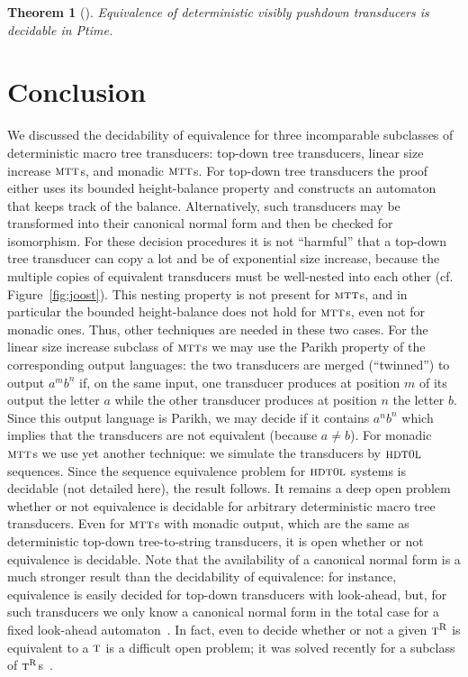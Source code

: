 \documentclass[copyright,creativecommons]{eptcs}
\newtheorem{theorem}{Theorem}
\newcommand{\tr}{\textsc{t}^{\text{R}}}
\newcommand{\ttt}{\textsc{t}}
\newcommand{\mtt}{\textsc{mtt}}
\newcommand{\hdtol}{\textsc{hdt{\small 0}l}}
\begin{document}
\begin{theorem}[\cite{DBLP:conf/fct/StaworkoLLN09}]
Equivalence of deterministic visibly pushdown transducers is
decidable in {\sc Ptime}.
\end{theorem}

\section{Conclusion}

We discussed the decidability of equivalence for three incomparable
subclasses of deterministic macro tree transducers:
top-down tree transducers, linear size increase $\mtt$s, and
monadic $\mtt$s.
For top-down tree transducers the proof either uses its bounded height-balance
property and constructs an automaton that keeps track of the balance.
Alternatively, such transducers may be transformed into their canonical normal form 
and then be checked for isomorphism. For these decision procedures it is not
``harmful'' that a top-down tree transducer can copy a lot and be
of exponential size increase, because the multiple copies of equivalent
transducers must be well-nested into each other (cf. Figure~\ref{fig:joost}).
This nesting property is not present for $\mtt$s, and in particular the 
bounded height-balance does not hold for $\mtt$s, even not for monadic ones.
Thus, other techniques are needed in these two cases.
For the linear size increase subclass of $\mtt$s we may use the Parikh
property of the corresponding output languages: the two transducers are
merged (``twinned'') to output $a^mb^n$ if, on the same input, one transducer
produces at position $m$ of its output the letter $a$ while the other
transducer produces at position $n$ the letter $b$. Since this output language
is Parikh, we may decide if it contains $a^nb^n$ which implies that the transducers
are not equivalent (because $a\not= b$).
For monadic $\mtt$s we use yet another technique:
we simulate the transducers by $\hdtol$ sequences. Since the sequence equivalence
problem for $\hdtol$ systems is decidable (not detailed here), the result follows.
It remains a deep open problem whether or not equivalence is decidable for
arbitrary deterministic macro tree transducers.
Even for $\mtt$s with monadic output, which are the same as deterministic
top-down tree-to-string transducers, it is open whether or not equivalence
is decidable. Note that the availability of a canonical normal form is a much
stronger result than the decidability of equivalence: for instance, equivalence
is easily decided for top-down transducers with look-ahead, but, for such
transducers we only know a canonical normal form in the 
total case for a fixed look-ahead automaton~\cite{DBLP:journals/corr/EngelfrietMS13}. 
In fact, even to decide
whether or not a given $\tr$ is equivalent to a $\ttt$ is a difficult
open problem; 
it was solved recently for a subclass of $\tr$s~\cite{DBLP:journals/corr/EngelfrietMS13}.


 
\end{document}
